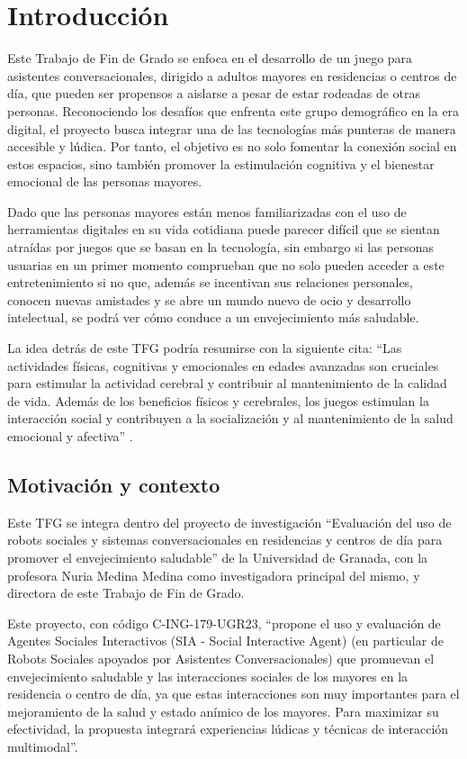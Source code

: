 \section{Introducción}
Este Trabajo de Fin de Grado se enfoca en el desarrollo de un juego para asistentes conversacionales, dirigido a adultos mayores en residencias o centros de día, que pueden ser propensos a aislarse a pesar de estar rodeadas de otras personas. Reconociendo los desafíos que enfrenta este grupo demográfico en la era digital, el proyecto busca integrar una de las tecnologías más punteras de manera accesible y lúdica. Por tanto, el objetivo es no solo fomentar la conexión social en estos espacios, sino también promover la estimulación cognitiva y el bienestar emocional de las personas mayores.

Dado que las personas mayores están menos familiarizadas con el uso de herramientas digitales en su vida cotidiana puede parecer difícil que se sientan atraídas por juegos que se basan en la tecnología, sin embargo si las personas usuarias en un primer momento comprueban que no solo pueden acceder a este entretenimiento si no que, además se incentivan sus relaciones personales, conocen nuevas amistades y se abre un mundo nuevo de ocio y desarrollo intelectual, se podrá ver cómo conduce a un envejecimiento más saludable.

La idea detrás de este TFG podría resumirse con la siguiente cita: \enquote{Las actividades físicas, cognitivas y emocionales en edades avanzadas son cruciales para estimular la actividad cerebral y contribuir al mantenimiento de la calidad de vida. Además de los beneficios físicos y cerebrales, los juegos estimulan la interacción social y contribuyen a la socialización y al mantenimiento de la salud emocional y afectiva} \parencite{intro3}.


\subsection{Motivación y contexto}

Este TFG se integra dentro del proyecto de investigación \enquote{Evaluación del uso de robots sociales y sistemas conversacionales en residencias y centros de día para promover el envejecimiento saludable} de la Universidad de Granada, con  la profesora Nuria Medina Medina como investigadora principal del mismo, y directora de este Trabajo de Fin de Grado.

Este proyecto, con código C-ING-179-UGR23, \enquote{propone el uso y evaluación de Agentes Sociales Interactivos (SIA - Social Interactive Agent) (en particular de Robots Sociales apoyados por Asistentes Conversacionales) que promuevan el envejecimiento saludable y las interacciones sociales de los mayores en la residencia o centro de día, ya que estas interacciones son muy importantes para el mejoramiento de la salud y estado anímico de los mayores. Para maximizar su efectividad, la propuesta integrará experiencias lúdicas y técnicas de interacción multimodal}. 

